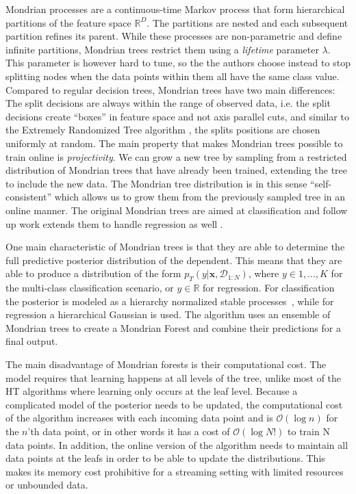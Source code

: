 Mondrian processes are a continuous-time
Markov process that form hierarchical partitions of the feature space $\mathbb{R}^D$.
The partitions are nested and each subsequent partition refines its parent. While
these processes are non-parametric and define infinite partitions, Mondrian trees
restrict them using a \emph{lifetime} parameter $\lambda$.
This parameter is however hard to tune,
so the the authors choose instead to stop splitting nodes when the data points
within them all have the same class value. Compared to regular decision trees,
Mondrian trees have two main differences: The split decisions are always within
the range of observed data, i.e. the split decisions create ``boxes'' in feature
space and not axis parallel cuts, and similar to the Extremely Randomized Tree algorithm
\cite{ert}, the splits positions are chosen uniformly at random. The main property that makes Mondrian trees possible to train
online is \emph{projectivity}. We can grow a new tree by sampling from a restricted
distribution of Mondrian trees that have already been trained, extending the tree
to include the new data. The Mondrian tree distribution is in this sense ``self-consistent''
\cite{mondrian-forests-original} which allows us to grow them from the previously
sampled tree in an online manner. The original Mondrian trees are aimed at classification
and follow up work extends them to handle regression as well \cite{mondrian-forests-regression}.

One main characteristic of Mondrian trees is that they are able to determine the full
predictive posterior distribution of the dependent. This means that they are able to
produce a distribution of the form $p_T(y |\mathbf{x}, \mathcal{D}_{1:N})$, where
$y \in {1,..., K}$ for the multi-class classification scenario, or $y \in \mathbb{R}$
for regression. For classification the posterior is modeled as a hierarchy
normalized stable processes~\cite{nsp}, while for regression a hierarchical Gaussian is used.
The algorithm uses an ensemble of Mondrian trees to create a Mondrian Forest and combine
their predictions for a final output.

The main disadvantage of Mondrian forests is their computational cost. The model
requires that learning happens at all levels of the tree, unlike most of the HT
algorithms where learning only occurs at the leaf level. Because a complicated
model of the posterior needs to be updated, the computational cost of the algorithm
increases with each incoming data point and is $\mathcal{O}(\log n)$ for the $n$'th
data point, or in other words it has a cost of $\mathcal{O}(\log N!)$ to train N
data points. In addition, the online version of the algorithm needs to maintain
all data points at the leafs in order to be able to update the distributions.
This makes its memory cost prohibitive for a streaming setting with limited resources
or unbounded data.

